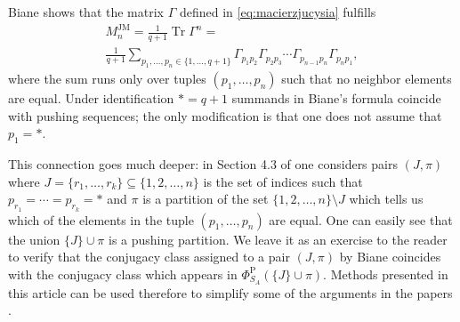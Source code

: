 \documentclass[12pt,dvips]{amsart}
\numberwithin{equation}{section} \numberwithin{figure}{section}
\theoremstyle{plain}
\theoremstyle{definition}
\theoremstyle{remark}
\newcommand{\C}{{\mathbb{C}}}
\newcommand{\M}{{\mathcal{M}}}
\newcommand{\Sn}[1]{{{S}}_{#1}}
\newcommand{\xtra}{\ast}
\newcommand{\fppsSym}{\Phi^{\pp}_{\Sn{A}}}
\newcommand{\MJM}{M^{\JM}}
\DeclareMathOperator{\JM}{JM}
\DeclareMathOperator{\pp}{P}
\DeclareMathOperator{\Tr}{Tr}
\begin{document}
Biane shows \cite{Biane1998} that the matrix $\Gamma$ defined in
\eqref{eq:macierzjucysia} fulfills
\begin{multline*}
\MJM_n=\frac{1}{q+1} \Tr \Gamma^n=\\
\frac{1}{q+1} \sum_{p_1,\dots,p_{n} \in\{1,\dots,q+1\}} \Gamma_{p_1
p_2} \Gamma_{p_2 p_3} \cdots \Gamma_{p_{n-1} p_n} \Gamma_{p_n p_1},
\end{multline*}
where the sum runs only over tuples $(p_1,\dots,p_n)$ such that no
neighbor elements are equal. Under identification $\xtra=q+1$
summands in Biane's formula coincide with pushing sequences; the
only modification is that one does not assume that $p_1=\xtra$.

This connection goes much deeper: in Section 4.3 of \cite{Biane1998}
one considers pairs $(J,\pi)$ where
$J=\{r_1,\dots,r_k\}\subseteq\{1,2,\dots,n\}$ is the set of indices
such that $p_{r_1}=\cdots=p_{r_k}=\xtra$ and $\pi$ is a partition of
the set $\{1,2,\dots,n\}\setminus J$ which tells us which of the
elements in the tuple $(p_1,\dots,p_n)$ are equal. One can easily
see that the union $\{J\} \cup \pi$ is a pushing partition. We leave
it as an exercise to the reader to verify that the conjugacy class
assigned to a pair $(J,\pi)$ by Biane coincides with the conjugacy
class which appears in $\fppsSym(\{J\} \cup \pi)$. Methods presented
in this article can be used therefore to simplify some of the
arguments in the papers \cite{Biane1998,Biane2001approximate}.
\end{document}
